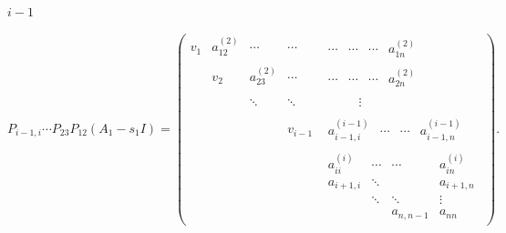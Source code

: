 \documentclass[UTF8,fontset=fandol]{ctexart}
\begin{document}
$i-1$\par
\[
P_{i-1,i}\cdots P_{23}P_{12}(A_1-s_1I)
=\begin{pmatrix}
v_1&a_{12}^{(2)}&\cdots&\cdots&\begin{matrix}\cdots&\cdots&\cdots&a_{1n}^{(2)}\end{matrix}\\
&v_2&a_{23}^{(2)}&\cdots&\begin{matrix}\cdots&\cdots&\cdots&a_{2n}^{(2)}\end{matrix}\\
&&\ddots&\ddots&\begin{matrix}&&&\vdots\end{matrix}\\
&&&v_{i-1}&\begin{matrix}a_{i-1,i}^{(i-1)}&\cdots&\cdots&a_{i-1,n}^{(i-1)}\end{matrix}\\
&&&&\boxed{\begin{matrix}
a_{ii}^{(i)}&\cdots&\cdots&a_{in}^{(i)}\\
a_{i+1,i}&\ddots&&a_{i+1,n}\\
&\ddots&\ddots&\vdots\\
&&a_{n,n-1}&a_{nn}
\end{matrix}}
\end{pmatrix}.
\]
\clearpage
\end{document}
